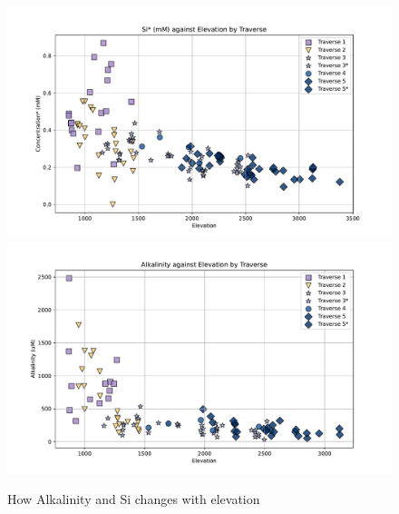 \begin{figure}[h]
    \centering
    \includegraphics[width=\textwidth]{Si_mM_EC_Elevation.pdf}
    \includegraphics[width=\textwidth]{Alkalinity_Elevation.pdf}
    \caption{How Alkalinity and Si changes with elevation}
    \label{fig:spatial_changes_spring2}
\end{figure}

\FloatBarrier



